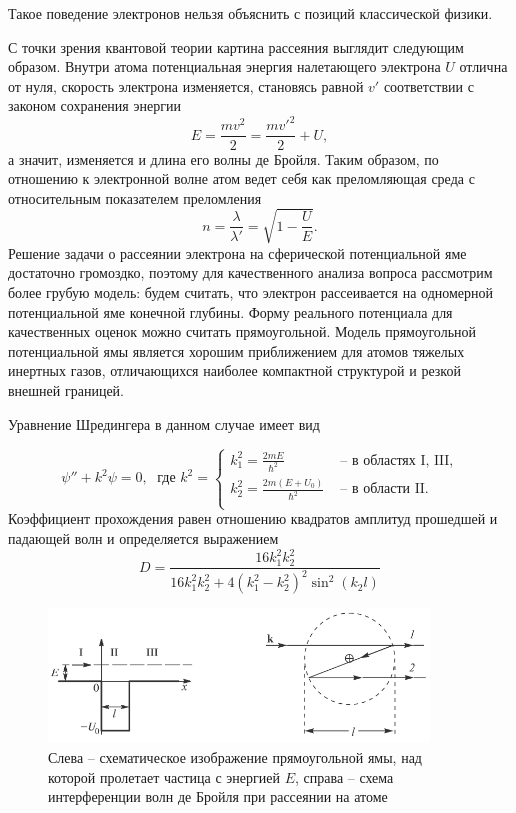 \documentclass[a4paper,12pt]{article}
\begin{document}
Такое поведение электронов нельзя объяснить с позиций классической физики.

С точки зрения квантовой теории картина рассеяния выглядит следующим образом. Внутри атома потенциальная энергия налетающего электрона $U$ отлична от нуля, скорость электрона изменяется, становясь равной $v'$ соответствии с законом сохранения энергии
\begin{equation}\label{eq: Energy conservation law}
    E = \frac{mv^2}{2} = \frac{mv'^2}{2} + U, 
\end{equation}
а значит, изменяется и длина его волны де Бройля. Таким образом, по отношению к электронной волне атом ведет себя как преломляющая среда с относительным показателем преломления
\begin{equation}\label{eq: Refractive index}
    n = \frac{\lambda}{\lambda'} = \sqrt{1 - \frac{U}{E}}.
\end{equation}
Решение задачи о рассеянии электрона на сферической потенциальной яме достаточно громоздко, поэтому для качественного анализа вопроса рассмотрим более грубую модель: будем считать, что электрон рассеивается на одномерной потенциальной яме конечной глубины. Форму реального потенциала для качественных оценок можно считать прямоугольной. Модель прямоугольной потенциальной ямы является хорошим приближением для атомов тяжелых инертных газов, отличающихся наиболее компактной структурой и резкой внешней границей.

Уравнение Шредингера в данном случае имеет вид

\begin{equation}\label{eq: Shroedenger equation}
    \psi'' + k^2\psi = 0,\; \text{ где } 
    k^2 = 
    \begin{cases}
        k_1^2 = \frac{2mE}{\hbar^2}& \text{ -- в областях  I, III}, \\
        k_2^2 = \frac{2m(E + U_0)}{\hbar^2}& \text{ -- в области II}. \\
    \end{cases} 
\end{equation}
Коэффициент прохождения равен отношению квадратов амплитуд прошедшей и падающей волн и определяется выражением
\begin{equation}\label{eq: Transmission coefficient}
    D = \frac{16k_1^2 k_2^2}{16k_1^2 k_2^2 + 4(k_1^2 - k_2^2)^2\sin^2(k_2l)}
\end{equation}

\begin{figure}[H]\label{fig: Potential well scheme}
    \centering
    \includegraphics[width = 0.9\textwidth]{Potential well.png}
    \caption{Слева -- схематическое изображение прямоугольной ямы, над которой пролетает частица с энергией $E$, справа -- схема интерференции волн де Бройля при рассеянии на атоме}
\end{figure}
\end{document}
